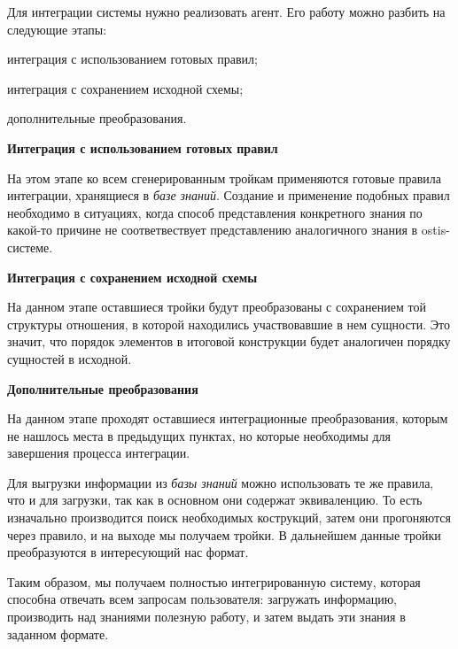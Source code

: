 Для интеграции системы нужно реализовать агент. Его работу можно разбить на следующие этапы:
\begin{textitemize}
    \item интеграция с использованием готовых правил;
    \item интеграция с сохранением исходной схемы;
    \item дополнительные преобразования.
\end{textitemize}

\textbf{Интеграция с использованием готовых правил}

На этом этапе ко всем сгенерированным тройкам применяются готовые правила интеграции, хранящиеся в \textit{базе знаний}. Создание и применение подобных правил необходимо в ситуациях, когда способ представления конкретного знания по какой-то причине не соответвествует представлению аналогичного знания в ostis-системе.

\textbf{Интеграция с сохранением исходной схемы}

На данном этапе оставшиеся тройки будут преобразованы с сохранением той структуры отношения, в которой находились участвовавшие в нем сущности. Это значит, что порядок элементов в итоговой конструкции будет аналогичен порядку сущностей в исходной.

\textbf{Дополнительные преобразования}

На данном этапе проходят оставшиеся интеграционные преобразования, которым не нашлось места в предыдущих пунктах, но которые необходимы для завершения процесса интеграции.

Для выгрузки информации из \textit{базы знаний} можно использовать те же правила, что и для загрузки, так как в основном они содержат эквиваленцию. То есть изначально производится поиск необходимых кострукций, затем они прогоняются через правило, и на выходе мы получаем тройки. В дальнейшем данные тройки преобразуются в интересующий нас формат.

Таким образом, мы получаем полностью интегрированную систему, которая способна отвечать всем запросам пользователя: загружать информацию, производить над знаниями полезную работу, и затем выдать эти знания в заданном формате.
